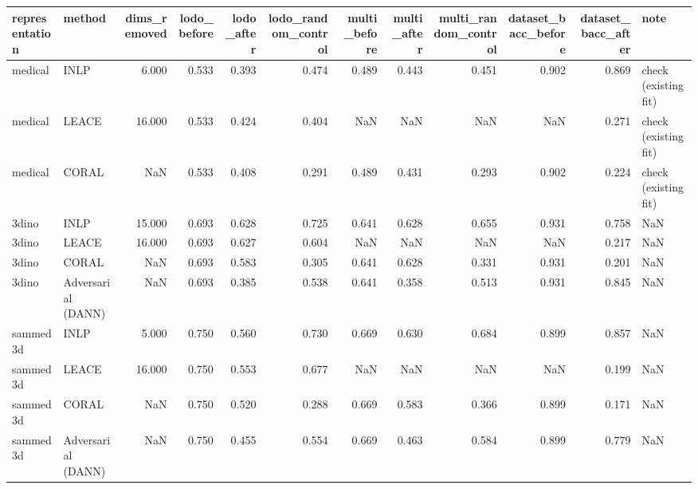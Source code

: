 \begin{tabular}{llrrrrrrrrrl}
\toprule
representation & method & dims\_removed & lodo\_before & lodo\_after & lodo\_random\_control & multi\_before & multi\_after & multi\_random\_control & dataset\_bacc\_before & dataset\_bacc\_after & note \\
\midrule
medical & INLP & 6.000 & 0.533 & 0.393 & 0.474 & 0.489 & 0.443 & 0.451 & 0.902 & 0.869 & check (existing fit) \\
medical & LEACE & 16.000 & 0.533 & 0.424 & 0.404 & NaN & NaN & NaN & NaN & 0.271 & check (existing fit) \\
medical & CORAL & NaN & 0.533 & 0.408 & 0.291 & 0.489 & 0.431 & 0.293 & 0.902 & 0.224 & check (existing fit) \\
3dino & INLP & 15.000 & 0.693 & 0.628 & 0.725 & 0.641 & 0.628 & 0.655 & 0.931 & 0.758 & NaN \\
3dino & LEACE & 16.000 & 0.693 & 0.627 & 0.604 & NaN & NaN & NaN & NaN & 0.217 & NaN \\
3dino & CORAL & NaN & 0.693 & 0.583 & 0.305 & 0.641 & 0.628 & 0.331 & 0.931 & 0.201 & NaN \\
3dino & Adversarial (DANN) & NaN & 0.693 & 0.385 & 0.538 & 0.641 & 0.358 & 0.513 & 0.931 & 0.845 & NaN \\
sammed3d & INLP & 5.000 & 0.750 & 0.560 & 0.730 & 0.669 & 0.630 & 0.684 & 0.899 & 0.857 & NaN \\
sammed3d & LEACE & 16.000 & 0.750 & 0.553 & 0.677 & NaN & NaN & NaN & NaN & 0.199 & NaN \\
sammed3d & CORAL & NaN & 0.750 & 0.520 & 0.288 & 0.669 & 0.583 & 0.366 & 0.899 & 0.171 & NaN \\
sammed3d & Adversarial (DANN) & NaN & 0.750 & 0.455 & 0.554 & 0.669 & 0.463 & 0.584 & 0.899 & 0.779 & NaN \\
\bottomrule
\end{tabular}
